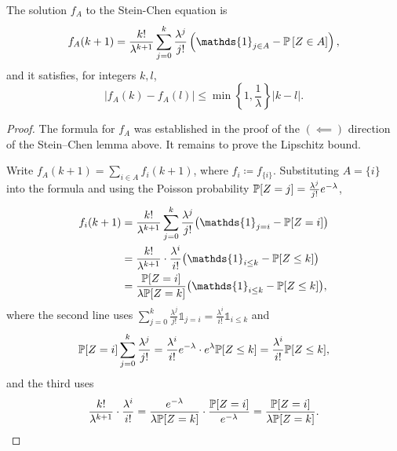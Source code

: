 \begin{lemma}
	The solution $f_A$ to the Stein-Chen equation is
	\[
		f_A(k+1) = \frac{k!}{\lambda^{k+1}} \sum\limits_{j=0}^{k} \frac{\lambda^j}{j!} \left( \mathds{1}_{j \in A}- \P\left[Z \in A\right]  \right)
	,\]
	and it satisfies, for integers $k,l$,
	\[
		\left| f_A(k) - f_A(l) \right| \le \min \left\{1,\frac{1}{\lambda}\right\} \left| k - l \right|
	.\]
\end{lemma}
\begin{proof}
	The formula for $f_A$ was established in the proof of the $(\impliedby)$ direction of the Stein--Chen lemma above. It remains to prove the Lipschitz bound.

	Write $f_A(k+1) = \sum_{i \in A} f_i(k+1)$, where $f_i \coloneqq f_{\{i\}}$. Substituting $A = \{i\}$ into the formula and using the Poisson probability $\P[Z = j] = \frac{\lambda^j}{j!}e^{-\lambda}$,
	\begin{align*}
		f_i(k+1)
		&= \frac{k!}{\lambda^{k+1}} \sum\limits_{j=0}^{k} \frac{\lambda^j}{j!}\bigl(\mathds{1}_{j=i} - \P[Z=i]\bigr) \\
		&= \frac{k!}{\lambda^{k+1}} \cdot \frac{\lambda^i}{i!}\bigl(\mathds{1}_{i \le k} - \P[Z \le k]\bigr) \\
		&= \frac{\P[Z=i]}{\lambda \P[Z=k]}\bigl(\mathds{1}_{i \le k} - \P[Z \le k]\bigr),
	\end{align*}
	where the second line uses $\sum_{j=0}^{k}\frac{\lambda^j}{j!}\mathds{1}_{j=i} = \frac{\lambda^i}{i!}\mathds{1}_{i \le k}$ and \[\P[Z=i]\sum_{j=0}^{k}\frac{\lambda^j}{j!} = \frac{\lambda^i}{i!}e^{-\lambda}\cdot e^{\lambda}\P[Z\le k] = \frac{\lambda^i}{i!}\P[Z\le k],\] and the third uses \[
		\frac{k!}{\lambda^{k+1}}\cdot\frac{\lambda^i}{i!} = \frac{e^{-\lambda}}{\lambda \P[Z=k]}\cdot\frac{\P[Z=i]}{e^{-\lambda}} = \frac{\P[Z=i]}{\lambda \P[Z=k]}
	.\]


\end{proof}
